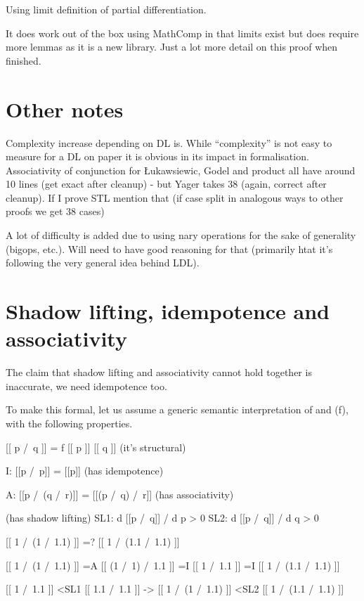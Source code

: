 \documentclass[a4paper,UKenglish,cleveref, autoref, thm-restate]{lipics-v2021}
\begin{document}
Using limit definition of partial differentiation.

It does work out of the box using MathComp in that limits exist but does require more lemmas as it is a new library.
Just a lot more detail on this proof when finished.


\section{Other notes}

Complexity increase depending on DL is. While ``complexity'' is not easy to measure for a DL on paper it is obvious in its impact in formalisation. Associativity of conjunction for Łukawsiewic, Godel and product all have around 10 lines (get exact after cleanup) - but Yager takes 38 (again, correct after cleanup). If I prove STL mention that (if case split in analogous ways to other proofs we get 38 cases)

A lot of difficulty is added due to using nary operations for the sake of generality (bigops, etc.). Will need to have good reasoning for that (primarily htat it's following the very general idea behind LDL).


\section{Shadow lifting, idempotence and associativity}

The claim that shadow lifting and associativity cannot hold together is inaccurate, we need idempotence too.

To make this formal, let us assume a generic semantic interpretation of and (f), with the following properties.

[[ p /\ q ]] = f [[ p ]]  [[ q ]] (it's structural)

I: [[p /\ p]] = [[p]] (has idempotence)

A: [[p /\ (q /\ r)]] = [[(p /\ q) /\ r]] (has associativity)
 
(has shadow lifting)
SL1: d [[p /\ q]] / d p > 0
SL2: d [[p /\ q]] / d q > 0


[[ 1 /\ (1 /\ 1.1) ]] =? [[ 1 /\ (1.1 /\ 1.1) ]]

[[ 1 /\ (1 /\ 1.1) ]] =A [[ (1 /\ 1) /\ 1.1 ]] =I [[ 1 /\ 1.1 ]] =I [[ 1 /\ (1.1 /\ 1.1) ]]



[[ 1 /\ 1.1 ]] <SL1 [[ 1.1 /\ 1.1 ]]
->
[[ 1 /\ (1 /\ 1.1) ]] <SL2 [[ 1 /\ (1.1 /\ 1.1) ]]






\appendix
\end{document}
